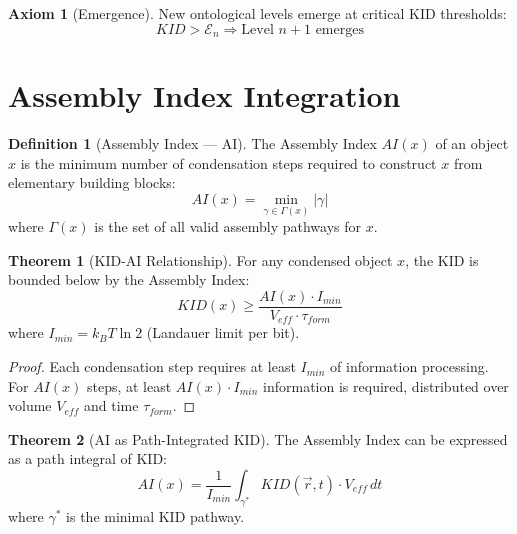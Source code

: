 \documentclass[11pt,a4paper]{article}
\theoremstyle{definition}
\newtheorem{definition}{Definition}[section]
\newtheorem{theorem}{Theorem}[section]
\newtheorem{axiom}{Axiom}[section]
\begin{document}
\begin{axiom}[Emergence]
New ontological levels emerge at critical KID thresholds:
\begin{equation}
KID > \mathcal{E}_n \Rightarrow \text{Level } n+1 \text{ emerges}
\end{equation}
\end{axiom}

\section{Assembly Index Integration}

\begin{definition}[Assembly Index --- AI]
The Assembly Index $AI(x)$ of an object $x$ is the minimum number of condensation steps required to construct $x$ from elementary building blocks:
\begin{equation}
AI(x) = \min_{\gamma \in \Gamma(x)} |\gamma|
\end{equation}
where $\Gamma(x)$ is the set of all valid assembly pathways for $x$.
\end{definition}

\begin{theorem}[KID-AI Relationship]
For any condensed object $x$, the KID is bounded below by the Assembly Index:
\begin{equation}
KID(x) \geq \frac{AI(x) \cdot I_{min}}{V_{eff} \cdot \tau_{form}}
\end{equation}
where $I_{min} = k_B T \ln 2$ (Landauer limit per bit).
\end{theorem}

\begin{proof}
Each condensation step requires at least $I_{min}$ of information processing. For $AI(x)$ steps, at least $AI(x) \cdot I_{min}$ information is required, distributed over volume $V_{eff}$ and time $\tau_{form}$.
\end{proof}

\begin{theorem}[AI as Path-Integrated KID]
The Assembly Index can be expressed as a path integral of KID:
\begin{equation}
AI(x) = \frac{1}{I_{min}} \int_{\gamma^*} KID(\vec{r}, t) \cdot V_{eff} \, dt
\end{equation}
where $\gamma^*$ is the minimal KID pathway.
\end{theorem}
\end{document}
